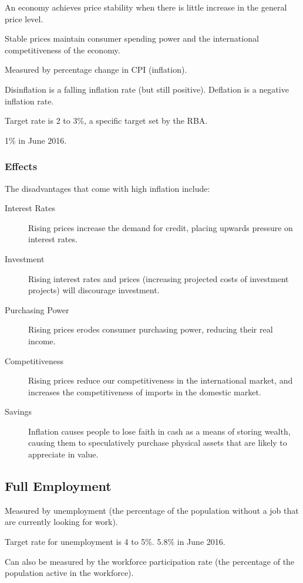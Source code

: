 \documentclass[a4paper,11pt]{report}
\begin{document}
An economy achieves price stability when there is little increase in the general
price level.

Stable prices maintain consumer spending power and the international
competitiveness of the economy.

Measured by percentage change in CPI (inflation).

Disinflation is a falling inflation rate (but still positive). Deflation is a
negative inflation rate.

Target rate is 2 to 3\%, a specific target set by the RBA.

1\% in June 2016.

\subsubsection{Effects}

The disadvantages that come with high inflation include:

\begin{description}
\item [Interest Rates] Rising prices increase the demand for credit, placing
	upwards pressure on interest rates.
\item [Investment] Rising interest rates and prices (increasing projected costs
	of investment projects) will discourage investment.
\item [Purchasing Power] Rising prices erodes consumer purchasing power,
	reducing their real income.
\item [Competitiveness] Rising prices reduce our competitiveness in the
	international market, and increases the competitiveness of imports in the
	domestic market.
\item [Savings] Inflation causes people to lose faith in cash as a means of
	storing wealth, causing them to speculatively purchase physical assets that
	are likely to appreciate in value.
\end{description}

\subsection{Full Employment}

Measured by unemployment (the percentage of the population without a job that
are currently looking for work).

Target rate for unemployment is 4 to 5\%. 5.8\% in June 2016.

Can also be measured by the workforce participation rate (the percentage of the
population active in the workforce).
\end{document}

